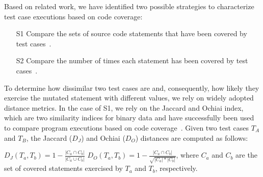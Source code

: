 Based on related work, we have identified two possible strategies to characterize test case executions based on code coverage:
\begin{itemize}
\item[S1] Compare the sets of source code statements that have been covered by test cases~\cite{grun2009impact}.
\item[S2] Compare the number of times each statement has been covered by test cases~\cite{schuler2013covering}.
\end{itemize}


To determine how dissimilar two test cases are and, consequently, how likely they exercise the mutated statement with different values, we rely on widely adopted distance metrics. 
In the case of S1, we rely on the Jaccard and Ochiai index, which are two similarity indices for binary data and have successfully been used to compare program executions based on code coverage~\cite{Zou:Ochiai:2019,Keller:Jaccard:2017,Briand:2019}. 
Given two test cases $T_A$ and $T_B$, the Jaccard  ($D_J$) and Ochiai ($D_O$) distances are computed as follows:

$D_J(T_a,T_b)=1-\frac{|C_a \cap C_b|}{|C_a \cup C_b|}$ \hspace{2mm} $D_O(T_a,T_b)=1-\frac{|C_a \cap C_b|}{\sqrt{|C_a| * |C_b|}}$, 
where $C_a$ and $C_b$ are the set of covered statements exercised by $T_a$ and $T_b$, respectively.

